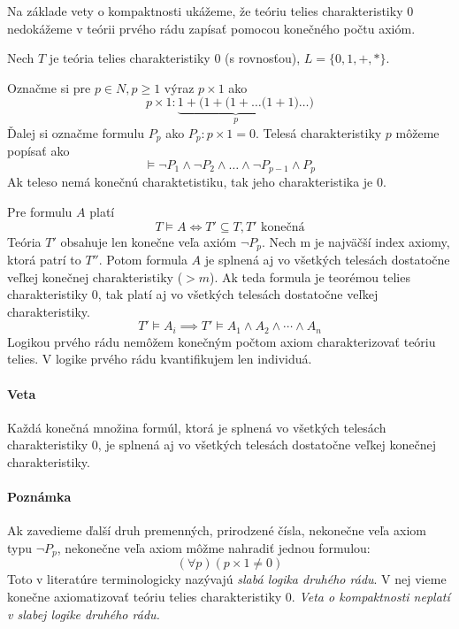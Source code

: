 \begin{priklad}
    Na základe vety o kompaktnosti ukážeme, že teóriu telies
    charakteristiky 0 nedokážeme v teórii prvého rádu zapísať
    pomocou konečného počtu axióm.

    Nech $T$ je teória telies charakteristiky 0 (s rovnosťou),
    $L=\{0,1,+,*\}$.
    
    Označme si pre $p\in N, p\ge 1$ výraz $p \times 1$ ako
    \begin{equation*}
        p \times 1 : \underbrace{1 + (1 + ( 1 + \dots (1 + 1}_{p}) \dots )
    \end{equation*}
    Ďalej si označme formulu $P_p$ ako $P_p: p \times 1 = 0$.
    Telesá charakteristiky $p$ môžeme popísať ako
    \begin{equation*}
     \models \neg P_1 \land \neg P_2 \land \dots \land \neg P_{p-1}
        \land P_p
    \end{equation*}
    Ak teleso nemá konečnú charaktetistiku, tak jeho charakteristika
    je 0.


    Pre formulu $A$ platí
    \begin{equation*}
     T \models A \iff T' \subseteq T, T'\mbox{ konečná}
    \end{equation*}
    Teória $T'$ obsahuje len konečne veľa axióm $\neg P_p$. Nech m je najväčší index
    axiomy, ktorá patrí to $T''$. Potom formula $A$ je splnená aj vo všetkých telesách dostatočne
    veľkej konečnej charakteristiky ($>m$). Ak teda formula je teorémou telies
    charakteristiky $0$, tak platí aj vo všetkých telesách dostatočne veľkej charakteristiky.
    $$ T' \models A_i \implies T' \models A_1 \land A_2 \land \cdots \land A_n $$
    Logikou prvého rádu nemôžem konečným počtom axiom charakterizovať teóriu telies.
    V logike prvého rádu kvantifikujem len individuá.

    \paragraph{Veta}
    Každá konečná množina formúl, ktorá je splnená vo všetkých telesách charakteristiky 0,
    je splnená aj vo všetkých telesách dostatočne veľkej konečnej charakteristiky.
\end{priklad}

\paragraph{Poznámka}
Ak zavedieme ďalší druh premenných, prirodzené čísla, nekonečne veľa axiom
typu $\neg P_p$, nekonečne veľa axiom môžme nahradiť jednou formulou:
$$ (\forall p)(p\times 1\not=0)$$
Toto v literatúre terminologicky nazývajú \emph{slabá logika druhého rádu}. V nej
vieme konečne axiomatizovať teóriu telies charakteristiky 0.
\emph{Veta o kompaktnosti neplatí v slabej logike druhého rádu.}

